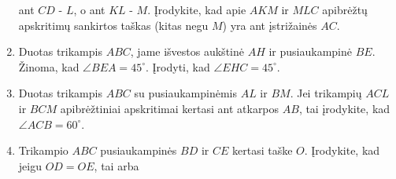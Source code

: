 \begin{enumerate}
  ant $CD$ - $L$, o ant $KL$ - $M$. Įrodykite, kad apie
  $AKM$ ir $MLC$ apibrėžtų apskritimų sankirtos taškas
  (kitas negu $M$) yra ant įstrižainės $AC$.
\item Duotas trikampis $ABC$, jame išvestos aukštinė $AH$ ir
  pusiaukampinė $BE$. Žinoma, kad $\angle BEA = 45^\circ$.
  Įrodyti, kad $\angle EHC = 45^\circ$.
\item Duotas trikampis $ABC$ su pusiaukampinėmis $AL$ ir
  $BM$. Jei trikampių $ACL$ ir $BCM$ apibrėžtiniai
  apskritimai kertasi ant atkarpos $AB$, tai įrodykite, kad
  $\angle ACB=60^\circ$.
\item Trikampio $ABC$ pusiaukampinės $BD$ ir $CE$ kertasi
  taške $O$. Įrodykite, kad jeigu $OD = OE$, tai arba

\end{enumerate}

